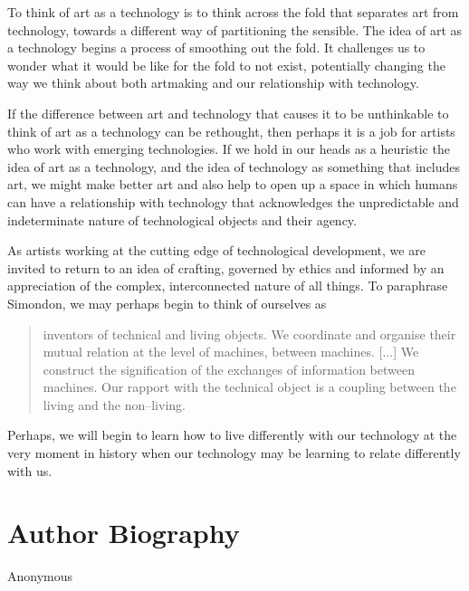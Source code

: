 \documentclass[letterpaper]{article}
\begin{document}
   To think of art as a technology is to think across the fold that separates art from technology, towards a different way of partitioning the sensible. The idea of art as a technology begins a process of smoothing out the fold. It challenges us to wonder what it would be like for the fold to not exist, potentially changing the way we think about both artmaking and our relationship with technology.
    
    If the difference between art and technology that causes it to be unthinkable to think of art as a technology can be rethought, then perhaps it is a job for artists who work with emerging technologies. If we hold in our heads as a heuristic the idea of art as a technology, and the idea of technology as something that includes art, we might make better art and also help to open up a space in which humans can have a relationship with technology that acknowledges the unpredictable and indeterminate nature of technological objects and their agency.
    
    As artists working at the cutting edge of technological development, we are invited to return to an idea of crafting, governed by ethics and informed by an appreciation of the complex, interconnected nature of all things. To paraphrase Simondon, we may perhaps begin to think of ourselves as
    
    \begin{quote}
        inventors of technical and living objects. We coordinate and organise their mutual relation at the level of machines, between machines. [...] We construct the signification of the exchanges of information between machines. Our rapport with the technical object is a coupling between the living and the non–living. \citep[p.xvi]{SimondonOnThMdOfExstncOfTechnclObjcts1980}
    \end{quote}

    Perhaps, we will begin to learn how to live differently with our technology at the very moment in history when our technology may be learning to relate differently with us.
    




\section{Author Biography}

Anonymous 
\end{document}
